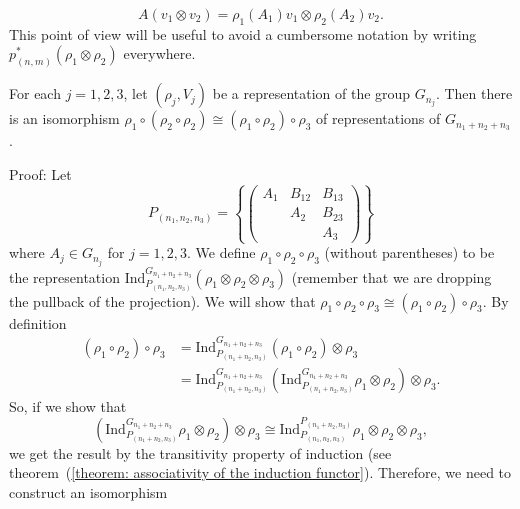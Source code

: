\begin{equation}
    A(v_1\otimes v_2)= \rho_1(A_1)v_1\otimes \rho_2(A_2)v_2.
\end{equation}
This point of view will be useful to avoid a cumbersome notation by writing $p_{(n,m)}^*(\rho_1\otimes\rho_2)$ everywhere.
\begin{dang}
    \begin{theorem}\label{theorem: associativity of parabolic induction}
         For each $j=1,2,3$, let $(\rho_j,V_j)$ be a representation of the group $G_{n_j}$. Then there is an isomorphism $\rho_1\circ(\rho_2\circ\rho_2)\cong (\rho_1\circ\rho_2)\circ\rho_3$  of representations of $G_{n_1+n_2+n_3}$.   
    \end{theorem}
\end{dang}
Proof: Let 
\begin{equation}
    P_{(n_1,n_2,n_3)}=\left\{\left(\begin{smallmatrix}
        A_1&B_{12}&B_{13}\\
           &A_2&B_{23}\\
           &   &A_3
    \end{smallmatrix}\right)\right\}
\end{equation}
where $A_j\in G_{n_j}$ for $j=1,2,3$. We define $\rho_1\circ\rho_2\circ\rho_3$ (without parentheses) to be the representation $\text{Ind}_{P_{(n_1,n_2,n_3)}}^{G_{n_1+n_2+n_3}}(\rho_1\otimes\rho_2\otimes\rho_3)$ (remember that we are dropping the pullback of the projection). We will show that $\rho_1\circ\rho_2\circ\rho_3\cong (\rho_1\circ\rho_2)\circ\rho_3$. By definition
\begin{equation}
    \begin{split}
        (\rho_1\circ\rho_2)\circ\rho_3&= \text{Ind}_{P_{(n_1+n_2,n_3)}}^{G_{n_1+n_2+n_3}}(\rho_1\circ\rho_2)\otimes\rho_3\\
        &=\text{Ind}_{P_{(n_1+n_2,n_3)}}^{G_{n_1+n_2+n_3}}(\text{Ind}_{P_{(n_1+n_2,n_3)}}^{G_{n_1+n_2+n_3}}\rho_1\otimes\rho_2)\otimes\rho_3.
    \end{split}
\end{equation}
So, if we show that 
\begin{equation}
    (\text{Ind}_{P_{(n_1+n_2,n_3)}}^{G_{n_1+n_2+n_3}}\rho_1\otimes\rho_2)\otimes\rho_3\cong \text{Ind}_{P_{(n_1,n_2,n_3)}}^{P_{(n_1+n_2,n_3)}}\rho_1\otimes\rho_2\otimes\rho_3,
\end{equation}
we get the result by the transitivity property of induction (see theorem~(\ref{theorem: associativity of the induction functor}). Therefore, we need to construct an isomorphism
